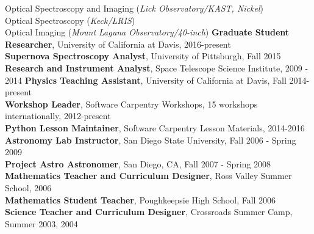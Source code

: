 \documentclass[10pt]{cv}
\begin{document}
\begin{llist}
Optical Spectroscopy and Imaging ({\it Lick Observatory/KAST, Nickel})\\
Optical Spectroscopy ({\it Keck/LRIS})\\
Optical Imaging ({\it Mount Laguna Observatory/40-inch})
%
    {\bf Graduate Student Researcher}, University of California at Davis, 2016-present \\
    {\bf Supernova Spectroscopy Analyst}, University of Pittsburgh, Fall 2015 \\
    {\bf Research and Instrument Analyst}, Space Telescope Science Institute, 2009 - 2014 
%
   {\bf Physics Teaching Assistant}, University of California at Davis, Fall 2014-present \\
   {\bf  Workshop Leader}, Software Carpentry Workshops, 15 workshops internationally, 2012-present \\	
   {\bf Python Lesson Maintainer}, Software Carpentry Lesson Materials, 2014-2016\\
   {\bf  Astronomy Lab Instructor}, San Diego State University, Fall 2006 - Spring 2009  \\
   {\bf Project Astro Astronomer}, San Diego, CA, Fall 2007 - Spring 2008 \\
   {\bf Mathematics Teacher and Curriculum Designer}, Ross Valley Summer School, 2006 \\
   {\bf Mathematics Student Teacher}, Poughkeepsie High School,  Fall 2006 \\
   {\bf Science Teacher and Curriculum Designer}, Crossroads Summer Camp, Summer 2003, 2004 \\
\end{llist}
\end{document}
